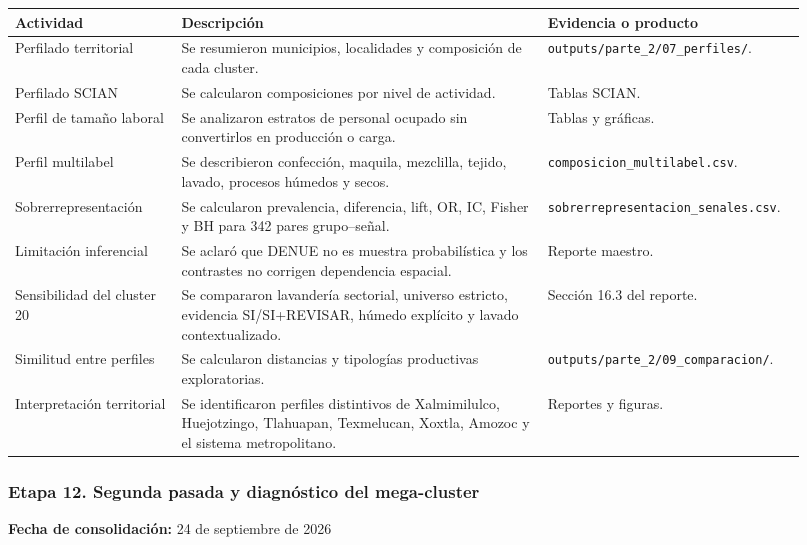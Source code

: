 \documentclass[
  spanish,
]{article}
\newcounter{none} %
\begin{document}
{\def\LTcaptype{none} %
\begin{longtable}[]{@{}p{0.20\linewidth}p{0.44\linewidth}p{0.28\linewidth}@{}}
\toprule\noalign{}
Actividad & Descripción & Evidencia o producto \\
\midrule\noalign{}
\endhead
\bottomrule\noalign{}
\endlastfoot
Perfilado territorial & Se resumieron municipios, localidades y
composición de cada cluster. &
\texttt{outputs/parte\_2/07\_perfiles/}. \\
Perfilado SCIAN & Se calcularon composiciones por nivel de actividad. &
Tablas SCIAN. \\
Perfil de tamaño laboral & Se analizaron estratos de personal ocupado
sin convertirlos en producción o carga. & Tablas y gráficas. \\
Perfil multilabel & Se describieron confección, maquila, mezclilla,
tejido, lavado, procesos húmedos y secos. &
\texttt{composicion\_multilabel.csv}. \\
Sobrerrepresentación & Se calcularon prevalencia, diferencia, lift, OR,
IC, Fisher y BH para 342 pares grupo--señal. &
\texttt{sobrerrepresentacion\_senales.csv}. \\
Limitación inferencial & Se aclaró que DENUE no es muestra
probabilística y los contrastes no corrigen dependencia espacial. &
Reporte maestro. \\
Sensibilidad del cluster 20 & Se compararon lavandería sectorial,
universo estricto, evidencia SI/SI+REVISAR, húmedo explícito y lavado
contextualizado. & Sección 16.3 del reporte. \\
Similitud entre perfiles & Se calcularon distancias y tipologías
productivas exploratorias. &
\texttt{outputs/parte\_2/09\_comparacion/}. \\
Interpretación territorial & Se identificaron perfiles distintivos de
Xalmimilulco, Huejotzingo, Tlahuapan, Texmelucan, Xoxtla, Amozoc y el
sistema metropolitano. & Reportes y figuras. \\
\end{longtable}
}

\subsubsection{Etapa 12. Segunda pasada y diagnóstico del
mega-cluster}\label{etapa-12-segunda-pasada-y-diagnuxf3stico-del-mega-cluster}

\textbf{Fecha de consolidación:} 24 de septiembre de 2026
\end{document}
